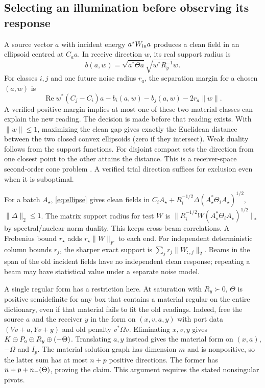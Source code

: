 \subsection{Selecting an illumination before observing its response}
A source vector $a$ with incident energy $a^*W_{\rm in}a$ produces a clean field in an ellipsoid centred at $C_a a$. In receive direction $w$, its real support radius is
\[
 b(a,w)=\sqrt{a^*\Theta a}\sqrt{w^*R_y^{-1}w}.
\]
For classes $i,j$ and one future noise radius $r_a$, the separation margin for a chosen $(a,w)$ is
\begin{equation}
 \operatorname{Re}w^*(C_j-C_i)a-b_i(a,w)-b_j(a,w)-2r_a\|w\| .
 \label{eq:gap}
\end{equation}
A verified positive margin implies at most one of these two material classes can explain the new reading. The decision is made before that reading exists. With $\|w\|\leq1$, maximizing the clean gap gives exactly the Euclidean distance between the two closed convex ellipsoids (zero if they intersect). Weak duality follows from the support functions. For disjoint compact sets the direction from one closest point to the other attains the distance. This is a receiver-space second-order cone problem \cite{boyd}. A verified trial direction suffices for exclusion even when it is suboptimal.

For a batch $A_\star$, \eqref{eq:ellipse} gives clean fields in
$C_iA_\star+R_i^{-1/2}\Delta(A_\star^*\Theta_iA_\star)^{1/2}$, $\|\Delta\|_2\leq1$. The matrix support radius for test $W$ is
$\|R_i^{-1/2}W(A_\star^*\Theta_iA_\star)^{1/2}\|_*$ by spectral/nuclear norm duality. This keeps cross-beam correlations. A Frobenius bound $r_\star$ adds $r_\star\|W\|_F$ to each end. For independent deterministic column bounds $r_j$, the sharper exact support is $\sum_j r_j\|W_{:,j}\|_2$. Beams in the span of the old incident fields have no independent clean response; repeating a beam may have statistical value under a separate noise model.

A single regular form has a restriction here. At saturation with $R_y\succ0$, $\Theta$ is positive semidefinite for any box that contains a material regular on the entire dictionary, even if that material fails to fit the old readings. Indeed, free the source $a$ and the receiver $y$ in the form on $(x,v,a,y)$ with port data $(Vv+a,Yv+y)$ and old penalty $v^*\Omega v$. Eliminating $x,v,y$ gives $K\oplus P_{\mathrm o}\oplus R_y\oplus(-\Theta)$. Translating $a,y$ instead gives the material form on $(x,a)$, $-\Omega$ and $I_p$. The material solution graph has dimension $m$ and is nonpositive, so the latter sum has at most $n+p$ positive directions. The former has $n+p+n_-(\Theta)$, proving the claim. This argument requires the stated nonsingular pivots.

